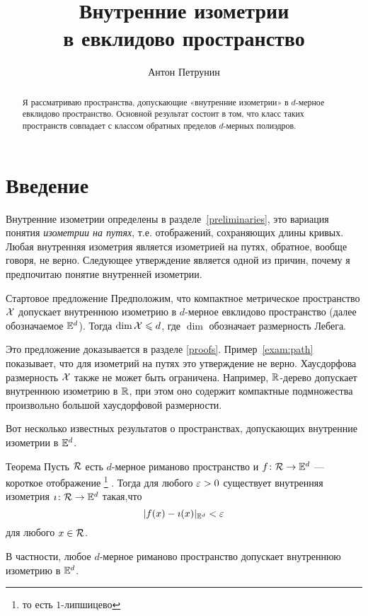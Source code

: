 \documentclass[oneside,a4paper]{article}
\begin{document}
\title{Внутренние изометрии \\
в евклидово пространство}
\author{Антон Петрунин}
\date{}
\maketitle

\begin{abstract}
Я рассматриваю пространства,
допускающие «внутренние изометрии» в $d$-мерное евклидово пространство.
Основной результат состоит в том, что класс таких пространств совпадает с классом обратных пределов $d$-мерных полиэдров. 
\end{abstract}

\section{Введение} 


Внутренние изометрии определены в разделе~\ref{preliminaries}, это вариация понятия \emph{изометрии на путях}, т.е. отображений, сохраняющих длины кривых.
Любая внутренняя изометрия является изометрией на путях, обратное, вообще говоря, не верно.
Следующее утверждение является одной из причин, почему я предпочитаю понятие внутренней изометрии.

\begin{thm}{Стартовое предложение}\label{top-dim}
Предположим, что компактное метрическое пространство $\mathcal{X}$ 
допускает внутреннюю изометрию в $d$-мерное евклидово пространство (далее обозначаемое $\mathbb{E}^d$).
Тогда 
$\mathop{\rm dim}\nolimits \mathcal{X}\leqslant d$,
где $\dim$ обозначает размерность Лебега.
\end{thm}

Это предложение доказывается в разделе \ref{proofs}.
Пример~\ref{exam:path} показывает,
что для изометрий на путях это утверждение не верно.
Хаусдорфова размерность $\mathcal{X}$ также не может быть ограничена.
Например, $\mathbb{R}$-дерево допускает внутреннюю изометрию в $\mathbb{R}$,
при этом оно содержит компактные подмножества произвольно большой хаусдорфовой размерности.

\medskip

Вот несколько известных результатов о пространствах, допускающих внутренние изометрии в $\mathbb{E}^d$.

\begin{thm}{Теорема}\label{thm:gromov}
Пусть $\mathcal{R}$ есть $d$-мерное риманово пространство 
и $f\:\spc{R}\z\to\EE^d$ --- короткое отображение%
\footnote{то есть $1$-липшицево}%
.
Тогда для любого $\varepsilon>0$ 
существует внутренняя изометрия $\imath\colon\mathcal{R}\to\mathbb{E}^d$
такая,что
$$|f(x)-\imath(x)|_{\mathbb{E}^d}<\varepsilon$$
для любого $x\in \mathcal{R}$.

В частности, любое $d$-мерное риманово пространство 
допускает внутреннюю изометрию в $\mathbb{E}^d$.
\end{thm}
\end{document}
